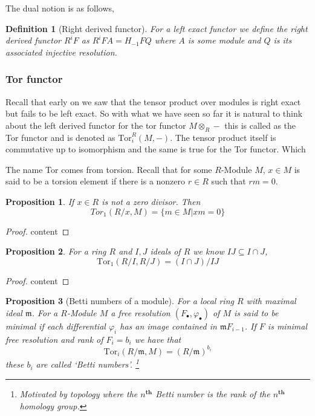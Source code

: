 \documentclass[12pt]{article}
\numberwithin{equation}{section}
\newtheorem{definition}{Definition}[section]
\newtheorem{proposition}{Proposition}[section]
\begin{document}
	 The dual notion is as follows,
	 \begin{definition}[Right derived functor]
	 	For a left exact functor we define the right derived functor $R^iF$ as $R^iFA=H_{-1}FQ$ where $A$ is some module and $Q$ is its associated injective resolution.
	 \end{definition}
	 
	 
	\subsubsection{Tor functor}
	Recall that early on we saw that the tensor product over modules is right exact but fails to be left exact. So with what we have seen so far it is natural to think about the left derived functor for the tor functor $M\otimes_R -$ this is called as the Tor functor and is denoted as $\mathrm{Tor}_i^R(M,-)$. The tensor product itself is commutative up to isomorphism and the same is true for the Tor functor. Which 
	
	The name Tor comes from torsion. Recall that for some $R$-Module $M$, $x \in M$ is said to be a torsion element if there is a nonzero $r\in R $ such that $rm=0$.
	\begin{proposition}
		If $x \in R$ is not a zero divisor. Then $$Tor_1(R/x,M)=\{m \in M | xm =0\}$$
	\end{proposition}
	\begin{proof}
		content
	\end{proof}
	\begin{proposition}
		For a ring $R$ and $I,J$ ideals of $R$ we know $IJ \subseteq I \cap J$, \[ \mathrm{Tor}_1(R/I, R/J)= (I \cap J )/IJ\]
	\end{proposition}
	\begin{proof}
		content
	\end{proof}
	
	\begin{proposition}[Betti numbers of a module]
		For a local ring $R$ with maximal ideal $\mathfrak{m}$. For a $R$-Module $M$ a free resolution $(F_\bullet, \varphi_\bullet)$ of $M$ is said to be minimal if each differential $\varphi_i$ has an image contained in $\mathfrak{m}F_{i-1}$. If $F$ is minimal free resolution and rank of $F_i=b_i$ we have that \[ \mathrm{Tor}_i(R/\mathfrak{m}, M)= 	(R/\mathfrak{m})^{b_i}\] these $b_i$ are called `Betti numbers'. \footnote{Motivated by topology where the $n^{\textbf{th}}$ Betti number is the rank of the $n^{\textbf{th}}$ homology group.}
	\end{proposition}
	
\end{document}

